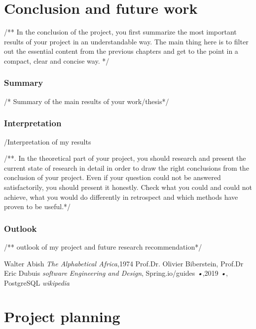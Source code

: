 \documentclass{scrartcl}
\begin{document}
\section{Conclusion and future work}
/**
 In the conclusion of the project, you first summarize the most important results of your project in an understandable way. The main thing here is to filter out the essential content from the previous chapters and get to the point in a compact, clear and concise way.
*/
\lipsum[6-7]

\subsubsection{Summary}
/* Summary of the main results of your work/thesis*/

\subsubsection{Interpretation }
/Interpretation of my results

/**. In the theoretical part of your project, you should research and present the current state of research in detail in order to draw the right conclusions from the conclusion of your project. Even if your question could not be answered satisfactorily, you should present it honestly. Check what you could and could not achieve, what you would do differently in retrospect and which methods have proven to be useful.*/

\subsubsection{Outlook}
/** outlook of my project and future research recommendation*/






\printbibliography[heading=bibintoc]


\begin{thebibliography}{books}
Walter Abish \emph{The Alphabetical Africa},1974
 Prof.Dr. Olivier Biberstein, Prof.Dr Eric Dubuis \emph{software Engineering and Design},
Spring.io/guides \emph{•},2019
 \emph{•},
 PostgreSQL \emph{wikipedia}
\end{thebibliography}


\section{Project planning}
\end{document}
